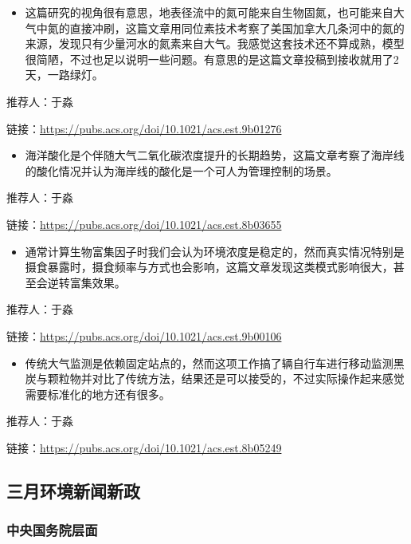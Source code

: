 \documentclass[]{book}
\providecommand{\tightlist}{%
  \setlength{\itemsep}{0pt}\setlength{\parskip}{0pt}}
\begin{document}
\begin{itemize}
\tightlist
\item
  这篇研究的视角很有意思，地表径流中的氮可能来自生物固氮，也可能来自大气中氮的直接冲刷，这篇文章用同位素技术考察了美国加拿大几条河中的氮的来源，发现只有少量河水的氮素来自大气。我感觉这套技术还不算成熟，模型很简陋，不过也足以说明一些问题。有意思的是这篇文章投稿到接收就用了2天，一路绿灯。
\end{itemize}

推荐人：于淼

链接：\url{https://pubs.acs.org/doi/10.1021/acs.est.9b01276}

\begin{itemize}
\tightlist
\item
  海洋酸化是个伴随大气二氧化碳浓度提升的长期趋势，这篇文章考察了海岸线的酸化情况并认为海岸线的酸化是一个可人为管理控制的场景。
\end{itemize}

推荐人：于淼

链接：\url{https://pubs.acs.org/doi/10.1021/acs.est.8b03655}

\begin{itemize}
\tightlist
\item
  通常计算生物富集因子时我们会认为环境浓度是稳定的，然而真实情况特别是摄食暴露时，摄食频率与方式也会影响，这篇文章发现这类模式影响很大，甚至会逆转富集效果。
\end{itemize}

推荐人：于淼

链接：\url{https://pubs.acs.org/doi/10.1021/acs.est.9b00106}

\begin{itemize}
\tightlist
\item
  传统大气监测是依赖固定站点的，然而这项工作搞了辆自行车进行移动监测黑炭与颗粒物并对比了传统方法，结果还是可以接受的，不过实际操作起来感觉需要标准化的地方还有很多。
\end{itemize}

推荐人：于淼

链接：\url{https://pubs.acs.org/doi/10.1021/acs.est.8b05249}

\hypertarget{ux4e09ux6708ux73afux5883ux65b0ux95fbux65b0ux653f}{%
\subsection*{三月环境新闻新政}\label{ux4e09ux6708ux73afux5883ux65b0ux95fbux65b0ux653f}}

\hypertarget{ux4e2dux592eux56fdux52a1ux9662ux5c42ux9762-1}{%
\subsubsection*{中央国务院层面}\label{ux4e2dux592eux56fdux52a1ux9662ux5c42ux9762-1}}
\end{document}
